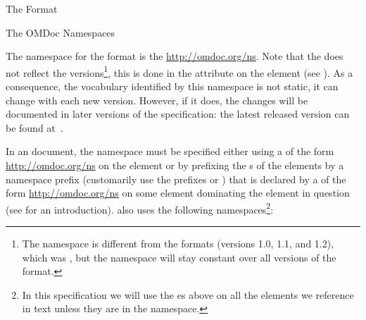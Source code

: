 \begin{omgroup}[creators=miko,id=spec-intro]{The \omdoc Format}
\begin{omgroup}[id=omdoc-ns]{The OMDoc Namespaces}

The namespace for the {} format is the 
\url{http://omdoc.org/ns}. Note that the \omdoc {}
does not reflect the versions\footnote{The namespace is different from the {}
  formats (versions 1.0, 1.1, and 1.2), which was
  {}, but the {} namespace will stay
  constant over all versions of the {} format.}, this is done in the
{} attribute on the {} element
 (see {}).  As a consequence, the
\omdoc vocabulary identified by this namespace is not static, it can change with each
new \omdoc version. However, if it does, the changes will be documented in later
versions of the specification: the latest released version can be found
at~\cite{URL:omdocspec}.

In an \omdoc document, the \omdoc namespace must be specified either using a
{} of the form
{}\url{http://omdoc.org/ns}{} on the  element
or by prefixing the {s} of the \omdoc elements by a namespace
prefix (\omdoc customarily use the prefixes {} or {}) that
is declared by a {} of the form
{}\url{http://omdoc.org/ns}{} on some element dominating the
\omdoc element in question (see {} for an introduction). \omdoc also
uses the following namespaces\footnote{In this specification we will use the
  {es} above on all the elements we reference in text unless
  they are in the \omdoc namespace.}:


\end{omgroup}
\end{omgroup}

